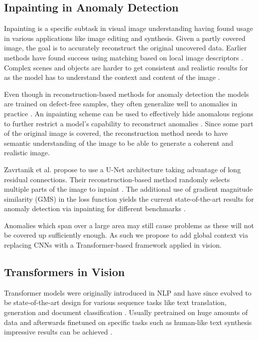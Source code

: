 \documentclass[final,5p,times,twocolumn]{elsarticle}
\begin{document}
	
	\subsection{Inpainting in Anomaly Detection}
	Inpainting is a specific subtask in visual image understanding having found usage in various applications like image editing and synthesis.
	Given a partly covered image, the goal is to accurately reconstruct the original uncovered data.
	Earlier methods have found success using matching based on local image descriptors \cite{Hays2007SceneCompletion}.
	Complex scenes and objects are harder to get consistent and realistic results for
	as the model has to understand the context and content of the image \cite{Satoshi2017inpainting, Yu_2018_CVPR}.
	
	Even though in reconstruction-based methods for anomaly detection the models are trained on defect-free samples, they often generalize well to anomalies in practice \cite{gong2019memorizing}.
	An inpainting scheme can be used to effectively hide anomalous regions to further restrict a model's capability to reconstruct anomalies  \cite{Bhattad2018DetectingAF,8614226, ZAVRTANIK2021107706, DBLP:journals/corr/abs-2010-01942}.
	Since some part of the original image is covered, the reconstruction method needs to have semantic understanding of the image to be able to generate a coherent and realistic image.
	
	Zavrtanik et al. propose to use a U-Net architecture \cite{10.1007/978-3-319-24574-4_28} taking advantage of long residual connections. Their reconstruction-based method randomly selects multiple parts of the image to inpaint \cite{ZAVRTANIK2021107706}.
	The additional use of gradient magnitude similarity (GMS) \cite{10.1109/TIP.2013.2293423} in the loss function yields the current state-of-the-art results for anomaly detection via inpainting for different benchmarks \cite{ZAVRTANIK2021107706}. 
	
	Anomalies which span over a large area may still cause problems as these will not be covered up sufficiently enough. 
	As such we propose to add global context via replacing CNNs with a Transformer-based framework applied in vision. 
	


	
	\subsection{Transformers in Vision}
	Transformer models were originally introduced in NLP and have since evolved to be state-of-the-art design for various sequence tasks like text translation, generation and document classification \cite{NIPS2017_3f5ee243, devlin2019bert, radford2019language, yang2020xlnet}. Usually pretrained on huge amounts of data and afterwards finetuned on specific tasks such as human-like text synthesis impressive results can be achieved \cite{radford2019language}.
	
\end{document}
